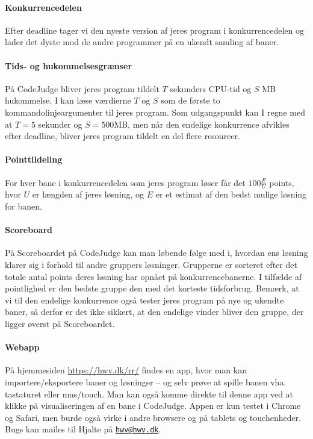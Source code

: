 \documentclass[10pt,a4paper]{article}
\begin{document}
\paragraph{Konkurrencedelen} Efter deadline tager vi den nyeste version af jeres program i konkurrencedelen og lader det dyste mod de andre programmer på en ukendt samling af baner.

\paragraph{Tids- og hukommelsesgrænser} På CodeJudge bliver jeres program tildelt $T$ sekunders CPU-tid og $S$ MB hukommelse. I kan læse værdierne $T$ og $S$ som de første to kommandolinjeargumenter til jeres program. Som udgangspunkt kan I regne med at $T=5$ sekunder og $S=500$MB, men når den endelige konkurrence afvikles efter deadline, bliver jeres program tildelt en del flere resourcer.

\paragraph{Pointtildeling} For hver bane i konkurrencedelen som jeres program løser får det $100 \frac{E}{U}$ points, hvor $U$ er længden af jeres løsning, og $E$ er et estimat af den bedst mulige løsning for banen.

\paragraph{Scoreboard} På Scoreboardet på CodeJudge kan man løbende følge med i, hvordan ens løsning klarer sig i forhold til andre gruppers løsninger. Grupperne er sorteret efter det totale antal points deres løsning har opnået på konkurrencebanerne. I tilfælde af pointlighed er den bedste gruppe den med det korteste tidsforbrug. Bemærk, at vi til den endelige konkurrence også tester jeres program på nye og ukendte baner, så derfor er det ikke sikkert, at den endelige vinder bliver den gruppe, der ligger øverst på Scoreboardet.

\paragraph{Webapp} På hjemmesiden \url{https://hwv.dk/rr/} findes en app, hvor man kan importere/eksportere baner og løsninger -- og selv prøve at spille banen vha. tastaturet eller mus/touch. Man kan også komme direkte til denne app ved at klikke på visualiseringen af en bane i CodeJudge. Appen er kun testet i Chrome og Safari, men burde også virke i andre browsere og på tablets og touchenheder. Bugs kan mailes til Hjalte på \href{mailto:hwv@hwv.dk}{\texttt{hwv@hwv.dk}}.
\end{document}
